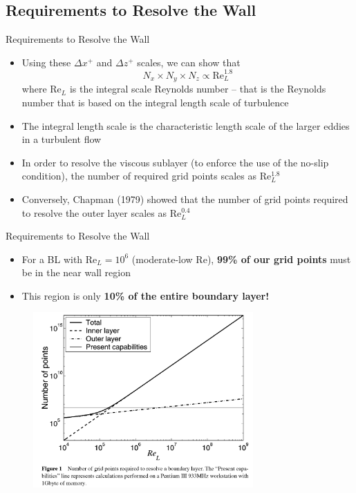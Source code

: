 \subsection{Requirements to Resolve the Wall}   %
\begin{frame}{Requirements to Resolve the Wall}
\begin{itemize}
	\item Using these $\Delta x^+$ and $\Delta z^+$ scales, we can show that
	$$N_x \times N_y \times N_z \propto \text{Re}_L^{1.8}$$
	where Re$_L$ is the integral scale Reynolds number -- that is the Reynolds number that is based on the integral length scale of turbulence
	\item The integral length scale is the characteristic length scale of the larger eddies in a turbulent flow
	\item In order to resolve the viscous sublayer (to enforce the use of the no-slip condition), the number of required grid points scales as Re$_L^{1.8}$
	\item Conversely, Chapman (1979) showed that the number of grid points required to resolve the outer layer scales as Re$_L^{0.4}$
\end{itemize}
\end{frame}
\begin{frame}{Requirements to Resolve the Wall}
\begin{itemize}
	\item For a BL with Re$_L=10^6$ (moderate-low Re), \textbf{99\% of our grid points} must be in the near wall region
	\item This region is only \textbf{10\% of the entire boundary layer! }
\end{itemize}
\begin{figure}
	\includegraphics[width=0.75\textwidth]{sbc1}
\end{figure}

\end{frame}

